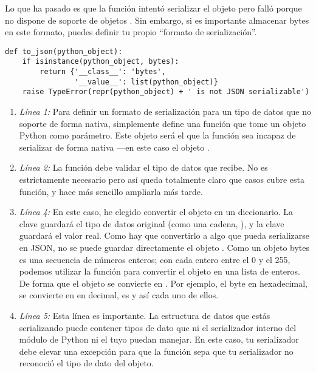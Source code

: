 Lo que ha pasado es que la función  intentó serializar el objeto  pero falló porque  no dispone de soporte de objetos . Sin embargo, si es importante almacenar bytes en este formato, puedes definir tu propio ``formato de serialización''.

\noindent\begin{minipage}{\textwidth}
\begin{lstlisting}[mathescape=True]
def to_json(python_object):            
    if isinstance(python_object, bytes):
        return {'__class__': 'bytes',
                '__value__': list(python_object)}
    raise TypeError(repr(python_object) + ' is not JSON serializable')
\end{lstlisting}
\end{minipage}

\begin{enumerate}

\item \emph{Línea 1:} Para definir un formato de serialización para un tipo de datos que  no soporte de forma nativa, simplemente define una función que tome un objeto Python como parámetro. Este objeto será el que la función  sea incapaz de serializar de forma nativa ---en este caso el objeto .

\item \emph{Línea 2:} La función debe validar el tipo de datos que recibe. No es estrictamente necesario pero así queda totalmente claro que casos cubre esta función, y hace más sencillo ampliarla más tarde.

\item \emph{Línea 4:} En este caso, he elegido convertir el objeto  en un diccionario. La clave  guardará el tipo de datos original (como una cadena, ), y la clave  guardará el valor real. Como hay que convertirlo a algo que pueda serializarse en JSON, no se puede guardar directamente el objeto . Como un objeto bytes es una secuencia de números enteros; con cada entero entre el 0 y el 255, podemos utilizar la función  para convertir el objeto  en una lista de enteros. De forma que el objeto  se convierte en \codigo{[222, 213, 180, 248]}. Por ejemplo, el byte  en hexadecimal, se convierte en  en decimal,  es  y así cada uno de ellos.

\item \emph{Línea 5:} Esta línea es importante. La estructura de datos que estás serializando puede contener tipos de dato que ni el serializador interno del módulo de Python ni el tuyo puedan manejar. En este caso, tu serializador debe elevar una excepción  para que la función  sepa que tu serializador no reconoció el tipo de dato del objeto.

\end{enumerate}

